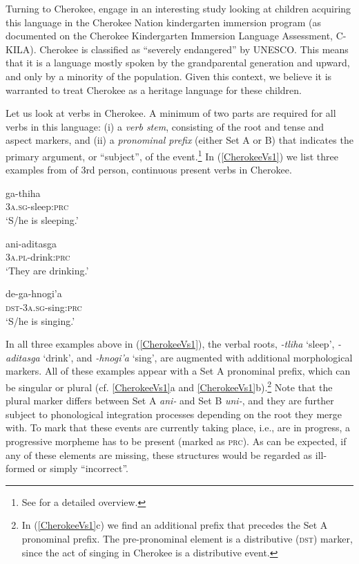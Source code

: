 \documentclass[output=paper,colorlinks,citecolor=brown,footheight=42pt]{langscibook}
\begin{document}
Turning to Cherokee, \citet{peter2008} engage in an interesting study looking at children acquiring this language in the Cherokee Nation kindergarten immersion program (as documented on the Cherokee Kindergarten Immersion Language Assessment, C-KILA). Cherokee is classified as “severely endangered” by UNESCO. This means that it is a language mostly spoken by the grandparental generation and upward, and only by a minority of the population. Given this context, we believe it is warranted to treat Cherokee as a heritage language for these children.

Let us look at verbs in Cherokee. A minimum of two parts are required for all verbs in this language: (i) a \textit{verb stem}, consisting of the root and tense and aspect markers, and (ii) a \textit{pronominal prefix} (either Set A or B) that indicates the primary argument, or “subject”, of the event.\footnote{See \citet[Ch.3 \& Ch. 4]{mont2015} for a detailed overview.} In (\ref{CherokeeVs1}) we list three examples from \citet[174--175]{peter2008} of 3rd person, continuous present verbs in Cherokee. 

\begin{exe}
\ex \label{CherokeeVs1}
\begin{xlist}
 
\ex \gll ga-thiha \\
         3\textsc{a.sg}-sleep:\textsc{prc} \\
         \glt `S/he is sleeping.' 

\ex \gll ani-aditasga \\
         \textsc{3a.pl}-drink:\textsc{prc} \\
         \glt `They are drinking.' 

\ex \gll de-ga-hnogi'a \\
         \textsc{dst-3a.sg}-sing:\textsc{prc} \\
         \glt `S/he is singing.' 
 
\end{xlist}
\end{exe}

In all three examples above in (\ref{CherokeeVs1}), the verbal roots, \textit{-tliha} `sleep', \textit{-aditasga} `drink', and \textit{-hnogi'a} `sing', are augmented with additional morphological markers. All of these examples appear with a Set A pronominal prefix, which can be singular or plural (cf. \ref{CherokeeVs1}a and \ref{CherokeeVs1}b).\footnote{In (\ref{CherokeeVs1}c) we find an additional prefix that precedes the Set A pronominal prefix. The pre-pronominal element is a distributive (\textsc{dst}) marker, since the act of singing in Cherokee is a distributive event.} Note that the plural marker differs between Set A \textit{ani-} and Set B \textit{uni-}, and they are further subject to phonological integration processes depending on the root they merge with. To mark that these events are currently taking place, i.e., are in progress, a progressive morpheme has to be present (marked as \textsc{prc}). As can be expected, if any of these elements are missing, these structures would be regarded as ill-formed or simply “incorrect”. 
\end{document}
